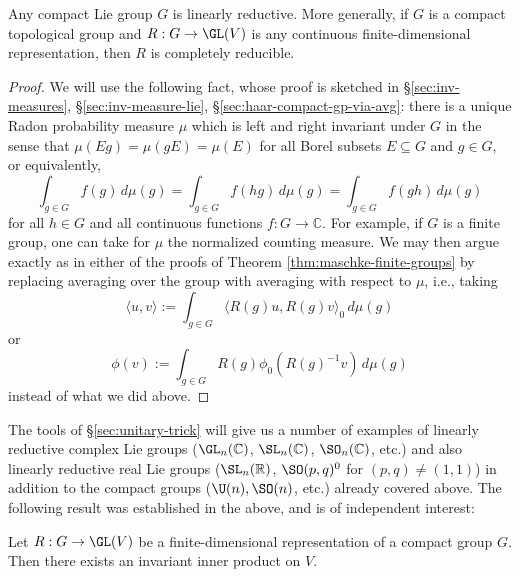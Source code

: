 \documentclass[reqno]{amsart} 
\begin{document}
\begin{theorem}\label{thm:compact-implies-lin-red}
  Any compact Lie group $G$ is linearly reductive.
  More generally, if $G$ is a compact topological group
  and $R : G \rightarrow \GL(V)$ is any continuous
  finite-dimensional
  representation, then $R$ is completely reducible.
\end{theorem}
\begin{proof}
  We will use the following fact, whose proof is sketched in
  \S\ref{sec:inv-measures}, \S\ref{sec:inv-measure-lie},
  \S\ref{sec:haar-compact-gp-via-avg}:
  there is a unique Radon probability measure $\mu$
  which is left and right invariant under $G$ in the sense that
  $\mu(E g) = \mu(g E) = \mu(E)$ for all Borel subsets $E
  \subseteq G$ and $g \in G$,
  or equivalently,
  \begin{equation*}
    \int_{g \in G} f(g) \, d \mu(g)
    =
    \int_{g \in G} f(h g) \, d \mu(g)
    =
    \int_{g \in G} f(g h) \, d \mu(g)
  \end{equation*}
  for all $h \in G$ and all continuous functions $f : G
  \rightarrow \mathbb{C}$.
  For example, if $G$ is a finite group, one can take for $\mu$
  the normalized
  counting measure.
  We may then argue exactly
  as in either of the proofs of Theorem
  \eqref{thm:maschke-finite-groups}
  by replacing averaging over the group with averaging with
  respect to $\mu$,
  i.e., taking
    \begin{equation*}
    \langle u, v \rangle :=
    \int_{g \in G}
    \langle R(g) u, R(g) v \rangle_0
    \, d \mu(g)
  \end{equation*}
  or
    \begin{equation*}
    \phi(v) :=  \int_{g \in G}
    R(g) \phi_0(R(g)^{-1} v) \, d \mu(g)
  \end{equation*}
  instead of what we did above.
\end{proof}

The tools of
\S\ref{sec:unitary-trick}
will give us a number of examples
of linearly reductive complex Lie groups
($\GL_n(\mathbb{C})$, $\SL_n(\mathbb{C})$, $\SO_n(\mathbb{C})$, etc.)
and also linearly reductive real Lie groups
($\SL_n(\mathbb{R})$,
$\SO(p,q)^0$ for $(p,q) \neq (1,1)$)
in addition to the compact groups
($\U(n),
\SO(n)$, etc.) already covered above.
The following result was established in the above, and is of
independent interest:
\begin{theorem}
  Let $R : G \rightarrow \GL(V)$ be a finite-dimensional
  representation
  of a compact group $G$.
  Then there exists an invariant inner product on $V$.
\end{theorem}
\end{document}
